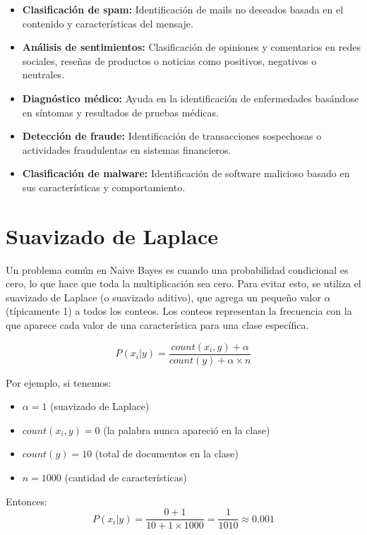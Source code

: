 \documentclass[12pt]{article}
\begin{document}
\begin{itemize}
    \item \textbf{Clasificación de spam:} Identificación de mails no deseados basada en el contenido y características del mensaje.
    
    \item \textbf{Análisis de sentimientos:} Clasificación de opiniones y comentarios en redes sociales, reseñas de productos o noticias como positivos, negativos o neutrales.
    
    \item \textbf{Diagnóstico médico:} Ayuda en la identificación de enfermedades basándose en síntomas y resultados de pruebas médicas.
    
    \item \textbf{Detección de fraude:} Identificación de transacciones sospechosas o actividades fraudulentas en sistemas financieros.
    
    \item \textbf{Clasificación de malware:} Identificación de software malicioso basado en sus características y comportamiento.
\end{itemize}

\section{Suavizado de Laplace}
Un problema común en Naive Bayes es cuando una probabilidad condicional es cero, lo que hace que toda la multiplicación sea cero. Para evitar esto, se utiliza el suavizado de Laplace (o suavizado aditivo), que agrega un pequeño valor $\alpha$ (típicamente 1) a todos los conteos. Los conteos representan la frecuencia con la que aparece cada valor de una característica para una clase específica.

\[
P(x_i|y) = \frac{count(x_i, y) + \alpha}{count(y) + \alpha \times n}
\]

Por ejemplo, si tenemos:
\begin{itemize}
    \item $\alpha = 1$ (suavizado de Laplace)
    \item $count(x_i, y) = 0$ (la palabra nunca apareció en la clase)
    \item $count(y) = 10$ (total de documentos en la clase)
    \item $n = 1000$ (cantidad de características)
\end{itemize}

Entonces:
\[
P(x_i|y) = \frac{0 + 1}{10 + 1 \times 1000} = \frac{1}{1010} \approx 0.001
\]
\end{document}
